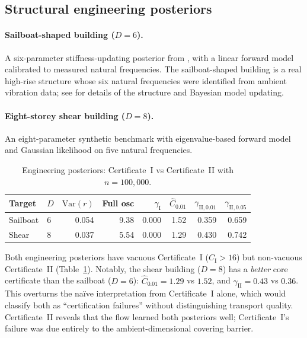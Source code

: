 \documentclass[12pt]{article}
\begin{document}
\subsection{Structural engineering posteriors}\label{sec:engineering}

\paragraph{Sailboat-shaped building ($D = 6$).}
A six-parameter stiffness-updating posterior from \citet{LamHu2019}, with a linear forward model calibrated to measured natural frequencies.
The sailboat-shaped building is a real high-rise structure whose six natural frequencies were identified from ambient vibration data; see \citet{LamHu2019} for details of the structure and Bayesian model updating.

\paragraph{Eight-storey shear building ($D = 8$).}
An eight-parameter synthetic benchmark with eigenvalue-based forward model and Gaussian likelihood on five natural frequencies.

\begin{table}[t]
\centering
\caption{Engineering posteriors: Certificate~I vs Certificate~II with $n = 100{,}000$.}
\label{tab:engineering}
\begin{tabular}{llrrrrrr}
\toprule
Target & $D$ & $\mathrm{Var}(r)$ & Full osc & $\gamma_{\mathrm{I}}$ & $\hat{C}_{0.01}$ & $\gamma_{\mathrm{II},0.01}$ & $\gamma_{\mathrm{II},0.05}$ \\
\midrule
Sailboat & 6 & 0.054 & 9.38 & 0.000 & 1.52 & 0.359 & 0.659 \\
Shear    & 8 & 0.037 & 5.54 & 0.000 & 1.29 & 0.430 & 0.742 \\
\bottomrule
\end{tabular}
\end{table}

Both engineering posteriors have vacuous Certificate~I ($C_{\mathrm{I}} > 16$) but non-vacuous Certificate~II (Table~\ref{tab:engineering}).
Notably, the shear building ($D = 8$) has a \emph{better} core certificate than the sailboat ($D = 6$): $\hat{C}_{0.01} = 1.29$ vs $1.52$, and $\gamma_{\mathrm{II}} = 0.43$ vs $0.36$.
This overturns the na\"ive interpretation from Certificate~I alone, which would classify both as ``certification failures'' without distinguishing transport quality.
Certificate~II reveals that the flow learned both posteriors well; Certificate~I's failure was due entirely to the ambient-dimensional covering barrier.
\end{document}
